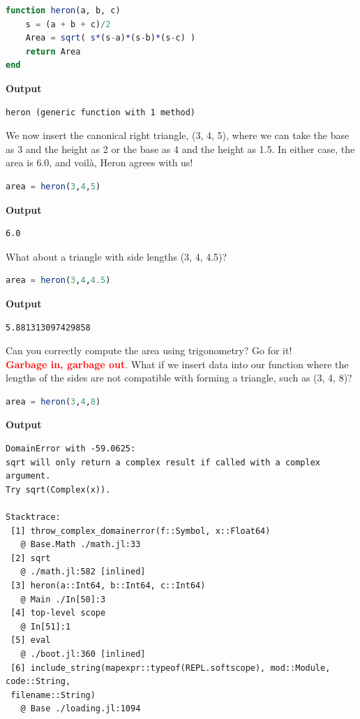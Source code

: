 \begin{lstlisting}[language=Julia,style=mystyle]
function heron(a, b, c)
    s = (a + b + c)/2
    Area = sqrt( s*(s-a)*(s-b)*(s-c) )
    return Area
end
\end{lstlisting}
\textbf{Output} 
\begin{verbatim}
heron (generic function with 1 method)
\end{verbatim}

We now insert the canonical right triangle, (3, 4, 5), where we can take the base as 3 and the height as 2 or the base as 4 and the height as 1.5. In either case, the area is 6.0, and voil\`a, Heron agrees with us! 
\begin{lstlisting}[language=Julia,style=mystyle]
area = heron(3,4,5)
\end{lstlisting}
\textbf{Output} 
\begin{verbatim}
6.0
\end{verbatim}

What about a triangle with side lengths (3, 4, 4.5)? \\

\begin{lstlisting}[language=Julia,style=mystyle]
area = heron(3,4,4.5)
\end{lstlisting}
\textbf{Output} 
\begin{verbatim}
5.881313097429858
\end{verbatim}

Can you correctly compute the area using trigonometry? Go for it! \\

\textcolor{red}{\bf \large Garbage in, garbage out}. What if we insert data into our function where the lengths of the sides are not compatible with forming a triangle, such as (3, 4, 8)?\\

\begin{lstlisting}[language=Julia,style=mystyle]
area = heron(3,4,8)
\end{lstlisting}
\textbf{Output} 
\begin{verbatim}
DomainError with -59.0625:
sqrt will only return a complex result if called with a complex argument. 
Try sqrt(Complex(x)).

Stacktrace:
 [1] throw_complex_domainerror(f::Symbol, x::Float64)
   @ Base.Math ./math.jl:33
 [2] sqrt
   @ ./math.jl:582 [inlined]
 [3] heron(a::Int64, b::Int64, c::Int64)
   @ Main ./In[50]:3
 [4] top-level scope
   @ In[51]:1
 [5] eval
   @ ./boot.jl:360 [inlined]
 [6] include_string(mapexpr::typeof(REPL.softscope), mod::Module, code::String, 
 filename::String)
   @ Base ./loading.jl:1094
\end{verbatim}

